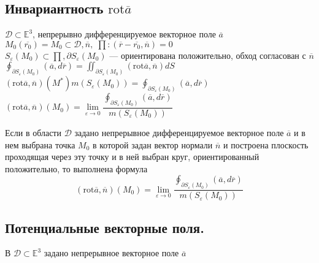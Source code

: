 \documentclass{letnab}
\begin{document}
\subsection{Инвариантность $ \mathrm{rot} \overline{a} $} 
$ \mathcal{D} \subset \mathbb{E}^3 $, непрерывно дифференцируемое векторное поле $ \overline{a} $\\
$ M_0(\overline{r_0})=M_0 \subset \mathcal{D}, \overline{n},\; \prod: (\overline{r} - \overline{r_0}, \overline{n}) = 0 $\\
$ S_\varepsilon(M_0) \subset \prod, \partial S_\varepsilon(M_0) $ --- ориентирована положительно, обход согласован с $ \overline{n} $\\
$ \oint_{\partial S_\varepsilon(M_0)} (\overline{a}, d\overline{r}) = \iint_{\partial S_\varepsilon(M_0)}(\mathrm{rot} \overline{a}, \overline{n})dS $\\
$ (\mathrm{rot} \overline{a}, \overline{n})(M^*)m(S_\varepsilon(M_0)) = \oint_{\partial S_\varepsilon(M_0)}(\overline{a}, d\overline{r}) $\\[0.5em]
$ (\mathrm{rot} \overline{a},\overline{n})(M_0) = \lim\limits_{\varepsilon \rightarrow 0} \dfrac{\oint_{\partial S_\varepsilon(M_0)} (\overline{a}, d\overline{r})}{m(S_\varepsilon(M_0))} $
\begin{theorem}
	Если в области $ \mathcal{D} $ задано непрерывное дифференцируемое векторное поле $ 
	\overline{a} $ и в нем выбрана точка $ M_0 $ в которой задан вектор нормали $ \overline{n} $ и построена плоскость проходящая через эту точку и в ней выбран круг, ориентированный положительно, то выполнена формула
	\[
	(\mathrm{rot} \overline{a}, \overline{n}) (M_0) = \lim\limits_{\varepsilon\rightarrow0} \frac{\oint_{\partial S_\varepsilon(M_0)}(\overline{a},d\overline{r})}{m(S_\varepsilon(M_0))}
	\]
\end{theorem}
\subsection{Потенциальные векторные поля.}
В $ \mathcal{D} \subset \mathbb{E}^3 $ задано непрерывное векторное поле $ \overline{a} $
\end{document}
